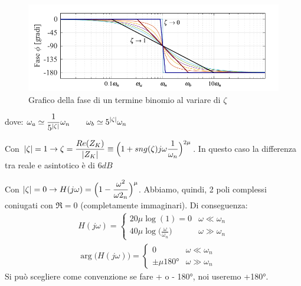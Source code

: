 \begin{figure}[H]
	\centering
	\includegraphics[width=0.8\linewidth]{immagini/cap6_Bode/bodeBin-fas.pdf}
	\caption{Grafico della fase di un termine binomio al variare di $ \zeta $}
	\label{fig:bodeBin-Fas}
\end{figure}
dove: $\displaystyle \omega_a \simeq \frac{1}{5^{\lvert\zeta\rvert}}\omega_n \qquad \omega_b \simeq 5^{\lvert\zeta\rvert}\omega_n$


	Con $\displaystyle \lvert\zeta\rvert=1 \rightarrow \zeta =\frac{Re (Z_K)}{\lvert Z_K\rvert} \equiv \Big(1+sng(\zeta)j \omega \frac{1}{\omega_n}\Big)^{2\mu} $. 	
	In questo caso la differenza tra reale e asintotico è di $ 6 dB $
	
	Con $ \displaystyle \lvert\zeta\rvert = 0 \rightarrow H(j\omega) = \Big(1-\frac{\omega^2}{\omega2_n}\Big)^\mu $.
	Abbiamo, quindi, 2 poli complessi coniugati con $ \Re =0 $ (completamente immaginari). Di conseguenza:
	\begin{gather*}
		H(j\omega)=
		\begin{cases}
			20\mu \log(1)=0 &\omega \ll \omega_n\\
			40\mu\log\big(\frac{\omega}{\omega_n}\big) &\omega \gg \omega_n
		\end{cases}\\
		\arg \big(H(j\omega)\big) = 
		\begin{cases}
			0 &\omega \ll \omega_n\\
			\pm \mu \ang{180} &\omega \gg \omega_n
		\end{cases}
	\end{gather*}
Si può scegliere come convenzione se fare + o - \ang{180}, noi useremo +\ang{180}.

